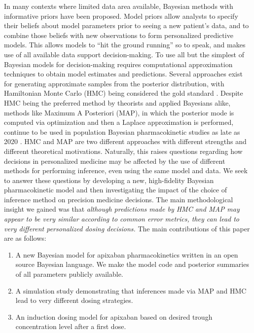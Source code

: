 In many contexts where limited data area available, Bayesian methods with informative priors have been proposed.  Model priors allow analysts to specify their beliefs about model parameters prior to seeing a new patient's data, and to combine those beliefs with new observations to form personalized predictive models.  This allows models to ``hit the ground running'' so to speak, and makes use of all available data support decision-making.  To use all but the simplest of Bayesian models for decision-making requires computational approximation techniques to obtain model estimates and predictions. Several approaches exist for generating approximate samples from the posterior distribution, with Hamiltonian Monte Carlo (HMC) being considered the gold standard \citep{Neal1996-vn, Matthew_D_Hoffman2014-in, Carpenter2017-qf, Tripuraneni2017-oh}. Despite HMC being the preferred method by theorists and applied Bayesians alike, methods like Maximum A Posteriori (MAP), in which the posterior mode is computed via optimization and then a Laplace approximation is performed, continue to be used in population Bayesian pharmacokinetic studies as late as 2020 \citep{Brooks2016-li, Nguyen2016-pg,  Preijers2019-kc,Stifft2020-uq}. HMC and MAP are two different approaches with different strengths and different theoretical motivations. Naturally, this raises questions regarding how decisions in personalized medicine may be affected by the use of different methods for performing inference, even using the same model and data. We seek to answer these questions by developing a new, high-fidelity Bayesian pharmacokinetic model and then investigating the impact of the choice of inference method on precision medicine decisions. The main methodological insight we gained was that \textit{although predictions made by HMC and MAP may appear to be very similar according to common error metrics, they can lead to very different personalized dosing decisions.} The main contributions of this paper are as follows: 

\begin{enumerate}
\item A new Bayesian model for apixaban pharmacokinetics written in an open source Bayesian language.  We make the model code and posterior summaries of all parameters publicly available.

\item A simulation study demonstrating that inferences made via MAP and HMC lead to very different dosing strategies.

\item An induction dosing model for apixaban based on desired trough concentration level after a first dose.
\end{enumerate}




